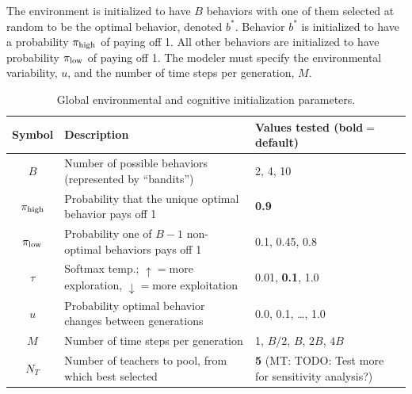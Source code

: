 \documentclass[letterpaper,11.5pt]{scrartcl}
\newcommand{\mt}[1]{{\textcolor{myorange} {({\tiny MT:} #1)}}}
\begin{document}
The environment is initialized to have $B$ behaviors with one of them selected
at random to be the optimal behavior, denoted $b^*$. Behavior $b^*$ is 
initialized to have a probability $\pi_{\mathrm{high}}$ of paying off 1. All other behaviors
are initialized to have probability $\pi_{\mathrm{low}}$ of paying off 1. The modeler must
specify the environmental variability, $u$, and the number of time steps per 
generation, $M$. 


\vspace{2em}
\begin{table}[h]
    \caption{Global environmental and cognitive initialization parameters.}
    \label{tab:modelParameters}
    \centering \hspace{-3em}
    \begin{tabular}{cp{4.0in}l} \toprule

        Symbol & Description & Values tested (bold$=$default) \\ 

        \midrule  

        $B$       & Number of possible behaviors (represented by ``bandits'') 
                  & 2, 4, 10 \\

        $\pi_{\mathrm{high}}$ & Probability that the unique optimal behavior pays off 1 
                & \textbf{0.9} \\

        $\pi_{\mathrm{low}}$ & Probability one of $B - 1$ non-optimal behaviors pays off 1 
                 & 0.1, 0.45, 0.8 \\ 

        $\tau$ & Softmax temp.; $\uparrow=$more exploration, $\downarrow=$more
                    exploitation 
               & 0.01, \textbf{0.1}, 1.0 \\
        
        $u$    & Probability optimal behavior changes between generations 
               & 0.0, 0.1, \ldots, 1.0 \\

        $M$    & Number of time steps per generation & 1, $B/2$, $B$, $2B$, $4B$ \\

        $N_T$    & Number of teachers to pool, from which best selected 
                 & \textbf{5} \mt{TODO: Test more for sensitivity analysis?} \\

            
               
        \bottomrule
        \end{tabular} 
\end{table}
\vspace{2em}
\end{document}
